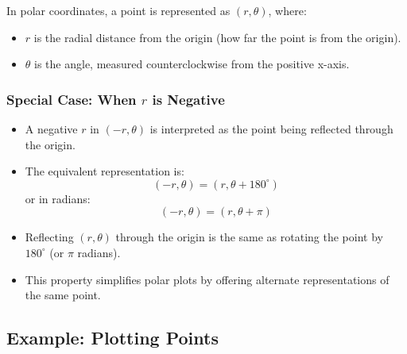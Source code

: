 \documentclass{article}
\begin{document}
\begin{conceptbox}
In polar coordinates, a point is represented as \( (r, \theta) \), where:
\begin{itemize}
    \item \( r \) is the radial distance from the origin (how far the point is from the origin).
    \item \( \theta \) is the angle, measured counterclockwise from the positive x-axis.
\end{itemize}

\begin{notebox}
    \subsubsection*{Special Case: When \( r \) is Negative}
    \begin{itemize}
        \item A negative \( r \) in \( (-r, \theta) \) is interpreted as the point being reflected through the origin.
        \item The equivalent representation is:
        \[
        (-r, \theta) = (r, \theta + 180^\circ)
        \]
        or in radians:
        \[
        (-r, \theta) = (r, \theta + \pi)
        \]
    \end{itemize}
\end{notebox}

\begin{intuitionbox}
    \begin{itemize}
        \item Reflecting \( (r, \theta) \) through the origin is the same as rotating the point by \( 180^\circ \) (or \( \pi \) radians).
        \item This property simplifies polar plots by offering alternate representations of the same point.
    \end{itemize}
\end{intuitionbox}
\end{conceptbox}

\subsection*{Example: Plotting Points}
\end{document}
